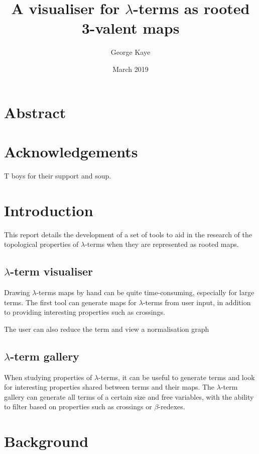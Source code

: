 \documentclass[12pt]{article}
\title{A visualiser for $\lambda$-terms as rooted 3-valent maps}
\author{George Kaye}
\date{March 2019}
\begin{document}


\tableofcontents

\newpage

\section{Abstract}
\label{sec:abstract}

\newpage

\section{Acknowledgements}
\label{sec:acks}
T boys for their support and soup.


\newpage

\section{Introduction}
\label{sec:intro}

This report details the development of a set of tools to aid in the research of the topological properties of $\lambda$-terms when they are represented as rooted maps.

\subsection{\texorpdfstring{$\lambda$}{lambda}-term visualiser}
Drawing $\lambda$-terms maps by hand can be quite time-consuming, especially for large terms. The first tool can generate maps for $\lambda$-terms from user input, in addition to providing interesting properties such as crossings.

The user can also reduce the term and view a normalisation graph

\subsection{\texorpdfstring{$\lambda$}{lambda}-term gallery}
When studying properties of $\lambda$-terms, it can be useful to generate terms and look for interesting properties shared between terms and their maps. The $\lambda$-term gallery can generate all terms of a certain size and free variables, with the ability to filter based on properties such as crossings or $\beta$-redexes.

\newpage

\section{Background}
\label{sec:background}
\end{document}
